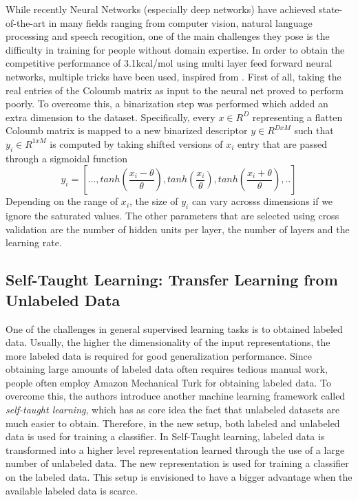 \documentclass[10pt,journal,a4paper]{IEEEtran}
\begin{document}
While recently Neural Networks (especially deep networks) have achieved state-of-the-art in many fields ranging from computer vision, natural language processing and speech recogition, one of the main challenges they pose is the difficulty in training for people without domain expertise. 
In order to obtain the competitive performance of 3.1kcal/mol using multi layer feed forward neural networks, multiple tricks have been used, inspired from \cite{tricks}. First of all, taking the real entries of the Coloumb matrix as input to the neural net proved to perform poorly.
To overcome this, a binarization step was performed which added an extra dimension to the dataset. Specifically, every $x \in R^{D}$ representing a flatten Coloumb matrix is mapped to a new binarized descriptor $y \in R^{DxM}$ such that $y_i \in R^{1xM}$ is computed by taking shifted versions of $x_i$ entry that are passed through a sigmoidal function
\begin{equation}
	y_i = [..., tanh(\frac{x_i - \theta}{\theta}), tanh(\frac{x_i}{\theta}), tanh(\frac{x_i + \theta}{\theta}),..]
\end{equation}
Depending on the range of $x_i$, the size of $y_i$ can vary acrosss dimensions if we ignore the saturated values.
The other parameters that are selected using cross validation are the number of hidden units per layer, the number of layers and the learning rate.

\subsection{Self-Taught Learning: Transfer Learning from Unlabeled Data}
 
One of the challenges in general supervised learning tasks is to obtained labeled data. Usually, the higher the dimensionality of the input representations, the more labeled data is required for good generalization performance. Since obtaining large amounts of labeled data often requires tedious manual work, people often employ Amazon Mechanical Turk for obtaining labeled data. To overcome this, the authors introduce another machine learning framework called \textit{self-taught learning}, which has as core idea the fact that unlabeled datasets are much easier to obtain. Therefore, in the new setup, both labeled and unlabeled data is used for training a classifier. In Self-Taught learning, labeled data is transformed into a higher level representation learned through the use of a large number of unlabeled data. The new representation  is used for training a classifier on the labeled data. This setup is envisioned to have a bigger advantage when the available labeled data is scarce. 
\end{document}
